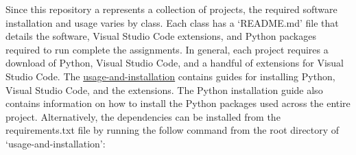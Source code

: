 Since this repository a represents a collection of projects, the required software 
installation and usage varies by class. Each class has a `README.md' file that details 
the software, Visual Studio Code extensions, and Python packages required to run complete 
the assignments. In general, each project requires a download of Python, Visual Studio 
Code, and a handful of extensions for Visual Studio Code. The 
\href{https://github.com/mKiloLA/python-based-mne/tree/develop/usage-and-installation}{usage-and-installation} 
contains guides for installing Python, Visual Studio Code, and the extensions. 
The Python installation guide also contains information on how to install the Python 
packages used across the entire project. Alternatively, the dependencies can be 
installed from the requirements.txt file by running the follow command from the root 
directory of `usage-and-installation':

\begin{center}
\end{center}
